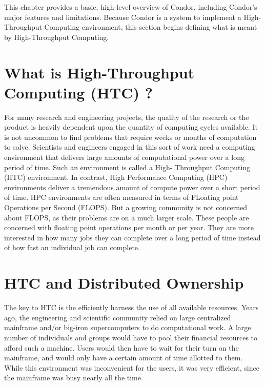 
This chapter provides a basic, high-level overview of Condor, including
Condor's major features and limitations. Because Condor is a system to
implement a High-Throughput Computing environment, this section begins
defining what is meant by High-Throughput Computing.


\section{What is High-Throughput Computing (HTC) ?}

For many research and engineering projects, the quality of the research
or the product is heavily dependent upon the quantity of computing
cycles available. It is not uncommon to find problems that require weeks
or months of computation to solve. Scientists and engineers engaged in
this sort of work need a computing environment that delivers large
amounts of computational power over a long period of time. Such an
environment is called a High- Throughput Computing (HTC) environment. In
contrast, High Performance Computing (HPC) environments deliver a
tremendous amount of compute power over a short period of time. HPC
environments are often measured in terms of FLoating point Operations
per Second (FLOPS). But a growing community is not concerned about
FLOPS, as their problems are on a much larger scale. These people are
concerned with floating point operations per month or per year. They are
more interested in how many jobs they can complete over a long period of
time instead of how fast an individual job can complete.

\section{HTC and Distributed Ownership}

The key to HTC is the efficiently harness the use of all available
resources. Years ago, the engineering and scientific community relied on
large centralized mainframe and/or big-iron supercomputers to do
computational work. A large number of individuals and groups would have
to pool their financial resources to afford such a machine. Users would
then have to wait for their turn on the mainframe, and would only have a
certain amount of time allotted to them. While this environment was
inconvenient for the users, it was very efficient, since the mainframe
was busy nearly all the time.


